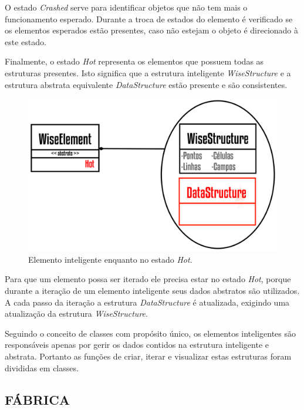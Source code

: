 \documentclass[a4paper,12pt]{monografia}
\theoremstyle{plain}
\theoremstyle{definition}
\theoremstyle{remark}
\begin{document}
O estado \textit{Crashed} serve para identificar objetos que não tem mais o funcionamento esperado. Durante a troca de estados do elemento é verificado se os elementos esperados estão presentes, caso não estejam o objeto é direcionado à este estado.

Finalmente, o estado \textit{Hot} representa os elementos que possuem todas as estruturas presentes. Isto significa que a estrutura inteligente \textit{WiseStructure} e a estrutura abstrata equivalente \textit{DataStructure} estão presente e são consistentes.

\begin{figure}[!htbp]
	\centering
	\includegraphics[scale=1.85]{Figures/WiseElementHot@16x.png}
	\caption{Elemento inteligente enquanto no estado \textit{Hot}.}
	\label{fig6:wiseelementhot}
\end{figure}

Para que um elemento possa ser iterado ele precisa estar no estado \textit{Hot}, porque durante a iteração de um elemento inteligente seus dados abstratos são utilizados. A cada passo da iteração a estrutura \textit{DataStructure} é atualizada, exigindo uma atualização da estrutura \textit{WiseStructure}.

Seguindo o conceito de classes com propósito único, os elementos inteligentes são responsáveis apenas por gerir os dados contidos na estrutura inteligente e abstrata. Portanto as funções de criar, iterar e visualizar estas estruturas foram divididas em classes.

\subsection{FÁBRICA}\label{sec:fabrica} 
 
\end{document}
